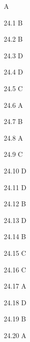\begin{Solution}{24}
A
\end{Solution}
\begin{Solution}{24.{1}}
B
\end{Solution}
\begin{Solution}{24.{2}}
B
\end{Solution}
\begin{Solution}{24.{3}}
D
\end{Solution}
\begin{Solution}{24.{4}}
D
\end{Solution}
\begin{Solution}{24.{5}}
C
\end{Solution}
\begin{Solution}{24.{6}}
A
\end{Solution}
\begin{Solution}{24.{7}}
B
\end{Solution}
\begin{Solution}{24.{8}}
A
\end{Solution}
\begin{Solution}{24.{9}}
C
\end{Solution}
\begin{Solution}{24.{10}}
D
\end{Solution}
\begin{Solution}{24.{11}}
D
\end{Solution}
\begin{Solution}{24.{12}}
B
\end{Solution}
\begin{Solution}{24.{13}}
D
\end{Solution}
\begin{Solution}{24.{14}}
B
\end{Solution}
\begin{Solution}{24.{15}}
C
\end{Solution}
\begin{Solution}{24.{16}}
C
\end{Solution}
\begin{Solution}{24.{17}}
A
\end{Solution}
\begin{Solution}{24.{18}}
D
\end{Solution}
\begin{Solution}{24.{19}}
B
\end{Solution}
\begin{Solution}{24.{20}}
A
\end{Solution}
